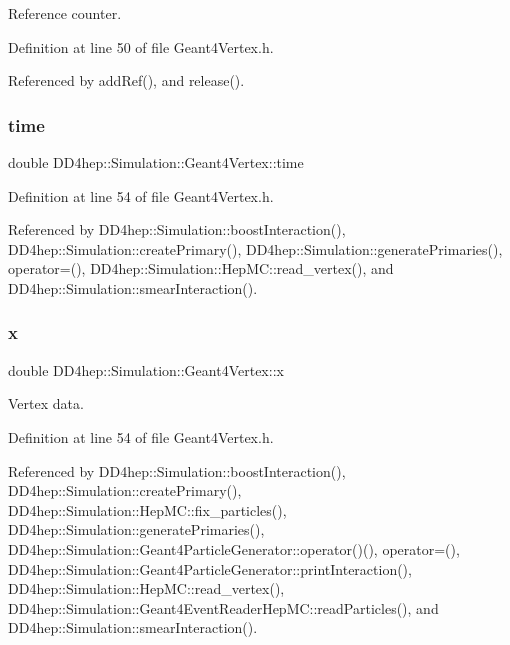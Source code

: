 Reference counter. 



Definition at line 50 of file Geant4\+Vertex.\+h.



Referenced by add\+Ref(), and release().

\hypertarget{class_d_d4hep_1_1_simulation_1_1_geant4_vertex_a3c68aa0fed7db61bf66bfcfb03ad5ca0}{}\label{class_d_d4hep_1_1_simulation_1_1_geant4_vertex_a3c68aa0fed7db61bf66bfcfb03ad5ca0} 
\subsubsection{\texorpdfstring{time}{time}}
{\footnotesize\ttfamily double D\+D4hep\+::\+Simulation\+::\+Geant4\+Vertex\+::time}



Definition at line 54 of file Geant4\+Vertex.\+h.



Referenced by D\+D4hep\+::\+Simulation\+::boost\+Interaction(), D\+D4hep\+::\+Simulation\+::create\+Primary(), D\+D4hep\+::\+Simulation\+::generate\+Primaries(), operator=(), D\+D4hep\+::\+Simulation\+::\+Hep\+M\+C\+::read\+\_\+vertex(), and D\+D4hep\+::\+Simulation\+::smear\+Interaction().

\hypertarget{class_d_d4hep_1_1_simulation_1_1_geant4_vertex_a0c73b563689113d23c51d5b5864a63f8}{}\label{class_d_d4hep_1_1_simulation_1_1_geant4_vertex_a0c73b563689113d23c51d5b5864a63f8} 
\subsubsection{\texorpdfstring{x}{x}}
{\footnotesize\ttfamily double D\+D4hep\+::\+Simulation\+::\+Geant4\+Vertex\+::x}



Vertex data. 



Definition at line 54 of file Geant4\+Vertex.\+h.



Referenced by D\+D4hep\+::\+Simulation\+::boost\+Interaction(), D\+D4hep\+::\+Simulation\+::create\+Primary(), D\+D4hep\+::\+Simulation\+::\+Hep\+M\+C\+::fix\+\_\+particles(), D\+D4hep\+::\+Simulation\+::generate\+Primaries(), D\+D4hep\+::\+Simulation\+::\+Geant4\+Particle\+Generator\+::operator()(), operator=(), D\+D4hep\+::\+Simulation\+::\+Geant4\+Particle\+Generator\+::print\+Interaction(), D\+D4hep\+::\+Simulation\+::\+Hep\+M\+C\+::read\+\_\+vertex(), D\+D4hep\+::\+Simulation\+::\+Geant4\+Event\+Reader\+Hep\+M\+C\+::read\+Particles(), and D\+D4hep\+::\+Simulation\+::smear\+Interaction().

